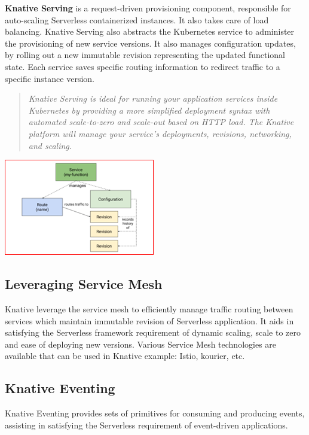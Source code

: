 \documentclass[12pt]{article}
\begin{document}
\begin{flushleft}
\textbf{Knative Serving} is a request-driven provisioning component, responsible for auto-scaling Serverless containerized instances. It also takes care of load balancing. 
Knative Serving also abstracts the Kubernetes service to administer the provisioning of new service versions. It also manages configuration updates, by rolling out a new immutable revision representing the updated functional state. Each service saves specific routing information to redirect traffic to a specific instance version.
\begin{quote}
   \textit{Knative Serving is ideal for running your application services inside Kubernetes by providing a more simplified deployment syntax with automated scale-to-zero and scale-out based on HTTP load. The Knative platform will manage your service’s deployments, revisions, networking, and scaling.} \\
   \cite{Sutter_Sampath_2020}
\end{quote}
\par
\includegraphics[]{images/knative-serving.png}

\subsection{Leveraging Service Mesh}
Knative leverage the service mesh to efficiently manage traffic routing between services which maintain immutable revision of Serverless application. It aids in satisfying the Serverless framework requirement of dynamic scaling, scale to zero and ease of deploying new versions. Various Service Mesh technologies are available that can be used in Knative example: Istio, kourier, etc.

\subsection{Knative Eventing}
Knative Eventing provides sets of primitives for consuming and producing events, assisting in satisfying the Serverless requirement of event-driven applications. 


\end{flushleft}
\end{document}

